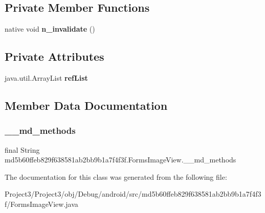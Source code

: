 \subsection*{Private Member Functions}
\begin{DoxyCompactItemize}
\item 
\mbox{\label{classmd5b60ffeb829f638581ab2bb9b1a7f4f3f_1_1FormsImageView_a3ff21f687d5c5d12663b6f5550c50550}} 
native void {\bfseries n\+\_\+invalidate} ()
\end{DoxyCompactItemize}
\subsection*{Private Attributes}
\begin{DoxyCompactItemize}
\item 
\mbox{\label{classmd5b60ffeb829f638581ab2bb9b1a7f4f3f_1_1FormsImageView_ab74a069616f95c91db7f837088703764}} 
java.\+util.\+Array\+List {\bfseries ref\+List}
\end{DoxyCompactItemize}


\subsection{Member Data Documentation}
\mbox{\label{classmd5b60ffeb829f638581ab2bb9b1a7f4f3f_1_1FormsImageView_a25caf4e2fd079c6fac24434fed5d06d0}} 
\subsubsection{\texorpdfstring{\+\_\+\+\_\+md\+\_\+methods}{\_\_md\_methods}}
{\footnotesize\ttfamily final String md5b60ffeb829f638581ab2bb9b1a7f4f3f.\+Forms\+Image\+View.\+\_\+\+\_\+md\+\_\+methods\hspace{0.3cm}{\ttfamily [static]}}



The documentation for this class was generated from the following file\+:\begin{DoxyCompactItemize}
\item 
Project3/\+Project3/obj/\+Debug/android/src/md5b60ffeb829f638581ab2bb9b1a7f4f3f/Forms\+Image\+View.\+java\end{DoxyCompactItemize}
